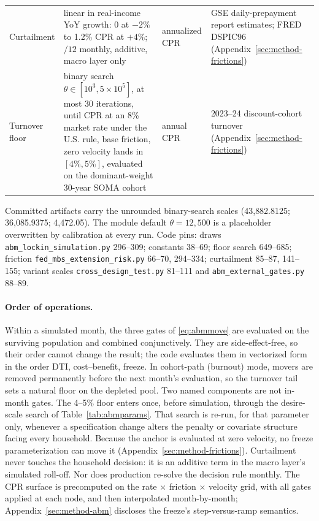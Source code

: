 \documentclass[12pt]{article}
\begin{document}
\begin{table}[H]
\begin{threeparttable}
\begin{tabular}{@{}p{3.3cm}p{5.9cm}p{1.6cm}p{4.0cm}@{}}
Curtailment & linear in real-income YoY growth: 0 at $-2\%$ to 1.2\% CPR at $+4\%$; $/12$ monthly, additive, macro layer only & annualized CPR & GSE daily-prepayment report estimates; FRED DSPIC96 (Appendix~\ref{sec:method-frictions}) \\
Turnover floor & binary search $\theta \in [10^{3}, 5\times10^{5}]$, at most 30 iterations, until CPR at an 8\% market rate under the U.S. rule, base friction, zero velocity lands in $[4\%, 5\%]$, evaluated on the dominant-weight 30-year SOMA cohort & annual CPR & 2023--24 discount-cohort turnover (Appendix~\ref{sec:method-frictions}) \\
\bottomrule
\end{tabular}
\begin{tablenotes}
\footnotesize
\item Committed artifacts carry the unrounded binary-search scales (43{,}882.8125; 36{,}085.9375; 4{,}472.05). The module default $\theta = 12{,}500$ is a placeholder overwritten by calibration at every run. Code pins: draws \texttt{abm\_lockin\_simulation.py} 296--309; constants 38--69; floor search 649--685; friction \texttt{fed\_mbs\_extension\_risk.py} 66--70, 294--334; curtailment 85--87, 141--155; variant scales \texttt{cross\_design\_test.py} 81--111 and \texttt{abm\_external\_gates.py} 88--89.
\end{tablenotes}
\end{threeparttable}
\end{table}

\paragraph{Order of operations.}
Within a simulated month, the three gates of \eqref{eq:abmmove} are evaluated on the surviving population and combined conjunctively. They are side-effect-free, so their order cannot change the result; the code evaluates them in vectorized form in the order DTI, cost--benefit, freeze. %
In cohort-path (burnout) mode, movers are removed permanently before the next month's evaluation, so the turnover tail sets a natural floor on the depleted pool. %
Two named components are not in-month gates. The 4--5\% floor enters once, before simulation, through the desire-scale search of Table~\ref{tab:abmparams}. That search is re-run, for that parameter only, whenever a specification change alters the penalty or covariate structure facing every household. Because the anchor is evaluated at zero velocity, no freeze parameterization can move it (Appendix~\ref{sec:method-frictions}). %
Curtailment never touches the household decision: it is an additive term in the macro layer's simulated roll-off. Nor does production re-solve the decision rule monthly. The CPR surface is precomputed on the rate $\times$ friction $\times$ velocity grid, with all gates applied at each node, and then interpolated month-by-month; Appendix~\ref{sec:method-abm} discloses the freeze's step-versus-ramp semantics. %
\end{document}
